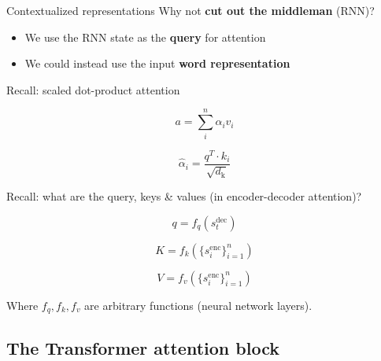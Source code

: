 \documentclass[12pt,aspectratio=169,handout]{beamer}
\begin{document}
\begin{frame}{Contextualized representations}
	Why not \textbf{cut out the middleman} (RNN)?
	\pause
	\begin{itemize}
		\item We use the RNN state as the \textbf{query} for attention
		\pause
		\item We could instead use the input \textbf{word representation}
	\end{itemize}
	\pause

	Recall: scaled dot-product attention

	\noindent\begin{minipage}{0.4\textwidth}
			$$
				a = \sum_i^n \alpha_i v_i
			$$ 
	\end{minipage}%
	\begin{minipage}{0.2\textwidth}
	\end{minipage}
	\begin{minipage}{0.4\textwidth}
			$$
				\hat{\alpha}_i = \frac{q^T \cdot k_i}{\sqrt{d_{\text{k} } } }
			$$
	\end{minipage}
	\pause

	Recall: what are the query, keys \& values (in encoder-decoder attention)?

	\noindent\begin{minipage}{0.29\textwidth}
		\vspace{1em}
		$$
			q = f_q(s^{\text{dec}}_t)
		$$ 
	\end{minipage}%
	\begin{minipage}{0.29\textwidth}
		$$
			K = f_k(\{s^{\text{enc}}_i\}_{i=1}^n)
		$$
	\end{minipage}
	\begin{minipage}{0.29\textwidth}
			$$
			 	V = f_v(\{s^{\text{enc}}_i\}_{i=1}^n)
			$$
	\end{minipage}

	\pause
	Where $f_q, f_k, f_v$ are arbitrary functions (neural network layers).

\end{frame}

\subsection{The Transformer attention block}
\end{document}
